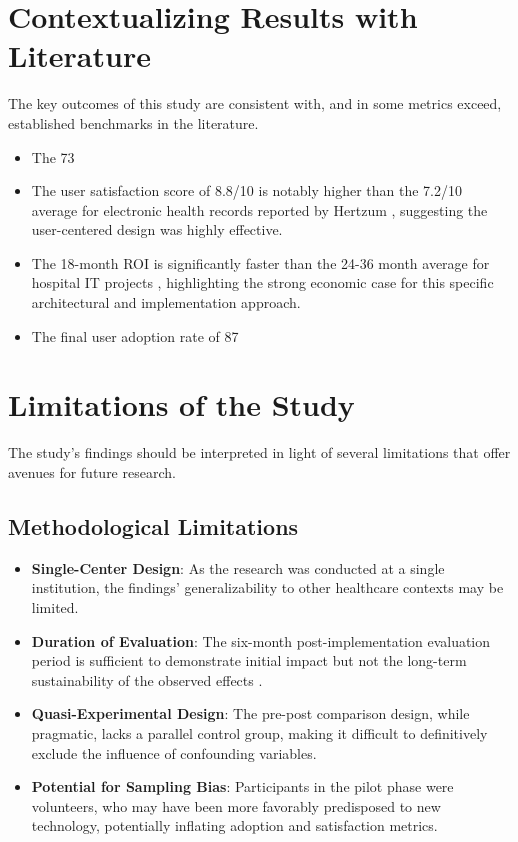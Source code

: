 \section{Contextualizing Results with Literature}

The key outcomes of this study are consistent with, and in some metrics exceed, established benchmarks in the literature.
\begin{itemize}
    \item The 73%
    \item The user satisfaction score of 8.8/10 is notably higher than the 7.2/10 average for electronic health records reported by Hertzum \cite{hertzum2022}, suggesting the user-centered design was highly effective.
    \item The 18-month ROI is significantly faster than the 24-36 month average for hospital IT projects \cite{adler2021}, highlighting the strong economic case for this specific architectural and implementation approach.
    \item The final user adoption rate of 87%
\end{itemize}

\section{Limitations of the Study}
The study's findings should be interpreted in light of several limitations that offer avenues for future research.

\subsection{Methodological Limitations}

\begin{itemize}
    \item \textbf{Single-Center Design}: As the research was conducted at a single institution, the findings' generalizability to other healthcare contexts may be limited.
    \item \textbf{Duration of Evaluation}: The six-month post-implementation evaluation period is sufficient to demonstrate initial impact but not the long-term sustainability of the observed effects \cite{greenhalgh2017}.
    \item \textbf{Quasi-Experimental Design}: The pre-post comparison design, while pragmatic, lacks a parallel control group, making it difficult to definitively exclude the influence of confounding variables.
    \item \textbf{Potential for Sampling Bias}: Participants in the pilot phase were volunteers, who may have been more favorably predisposed to new technology, potentially inflating adoption and satisfaction metrics.
\end{itemize}

